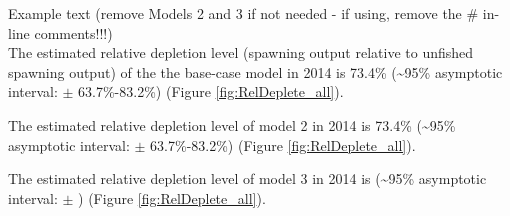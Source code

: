 \documentclass[12pt,]{article}
\begin{document}
Example text (remove Models 2 and 3 if not needed - if using, remove the
\# in-line comments!!!)\\
The estimated relative depletion level (spawning output relative to
unfished spawning output) of the the base-case model in 2014 is 73.4\%
(\textasciitilde{}95\% asymptotic interval: \(\pm\) 63.7\%-83.2\%)
(Figure \ref{fig:RelDeplete_all}).

The estimated relative depletion level of model 2 in 2014 is 73.4\%
(\textasciitilde{}95\% asymptotic interval: \(\pm\) 63.7\%-83.2\%)
(Figure \ref{fig:RelDeplete_all}).

The estimated relative depletion level of model 3 in 2014 is
(\textasciitilde{}95\% asymptotic interval: \(\pm\) ) (Figure
\ref{fig:RelDeplete_all}).

\FloatBarrier
\end{document}
